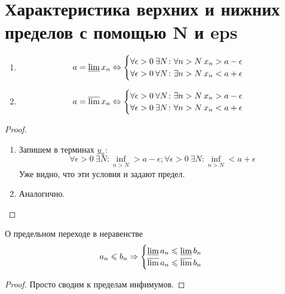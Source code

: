 ﻿\section{Характеристика верхних и нижних пределов с помощью N и eps}
\begin{theorem}{}
\begin{enumerate}
\item $$a = \varliminf x_n \Leftrightarrow \begin{cases}\forall \epsilon > 0\: \exists N\colon \forall n>N\: x_n > a - \epsilon \\ \forall \epsilon > 0\: \forall N\colon \exists n>N\: x_n < a + \epsilon\end{cases}$$
\item $$a = \varlimsup x_n \Leftrightarrow \begin{cases}\forall \epsilon > 0\: \forall N\colon \exists n>N\: x_n > a - \epsilon \\ \forall \epsilon > 0\: \exists N\colon \forall n>N\: x_n < a + \epsilon\end{cases}$$
\end{enumerate}
\end{theorem}
\begin{proof}
\begin{enumerate}
\item Запишем в терминах $y_n$:
$$\forall \epsilon > 0\: \exists N\colon \inf_{n>N} > a-\epsilon ; \forall \epsilon > 0\: \exists N\colon \inf_{n>N} < a+\epsilon$$
Уже видно, что эти условия и задают предел.
\item Аналогично.
\end{enumerate}
\end{proof}

\begin{theorem}{О предельном переходе в неравенстве}
$$a_n \leqslant b_n \Rightarrow \begin{cases}\varliminf a_n \leqslant \varliminf b_n \\ \varlimsup a_n \leqslant \varlimsup b_n\end{cases}$$
\end{theorem}                                                                                                                       
\begin{proof}
Просто сводим к пределам инфимумов. 
\end{proof}